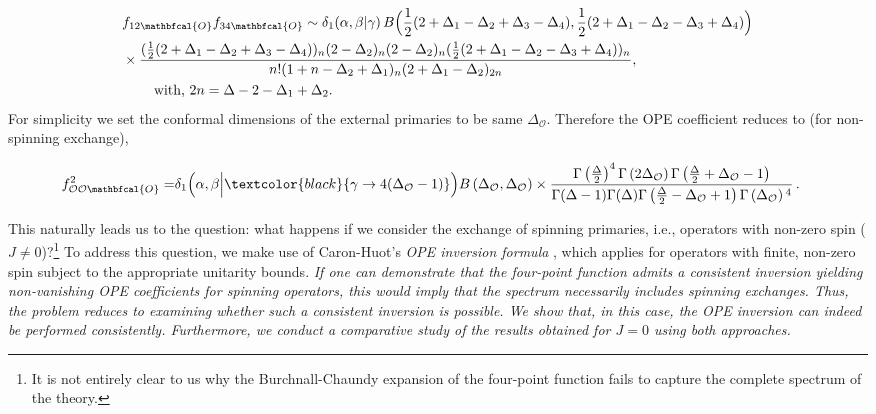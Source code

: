 \begin{align}
    \begin{split}
&f_{12\mathbfcal{O}}f_{34\mathbfcal{O}}\sim \delta_1(\alpha,\beta|\gamma) \,B\Big(\frac{1}{2}(2+\Delta_1-\Delta_2+\Delta_3-\Delta_4),\frac{1}{2}(2+\Delta_1-\Delta_2-\Delta_3+\Delta_4)\Big) \\ &\hspace{0 cm}\times\frac{(\frac{1}{2}(2+\Delta_1-\Delta_2+\Delta_3-\Delta_4))_n(2-\Delta_2)_n(2-\Delta_2)_n(\frac{1}{2}(2+\Delta_1-\Delta_2-\Delta_3+\Delta_4))_n}{  n!(1+n-\Delta_2+\Delta_1 )_n (2+\Delta_1-\Delta_2 )_{2n}},\,\,\,\\&\hspace{0.8cm}\textrm{with,\,\,}2n=\Delta-2-\Delta_1+\Delta_2.
    \end{split}
\end{align}
For simplicity we set the conformal dimensions of  the external primaries to be same $\Delta_{\mathcal{O}}$. Therefore the OPE coefficient reduces to (for non-spinning exchange),

\begin{tcolorbox}[thesisresultbox, title=OPE coefficient for EFT correction (scalar exchange)]
\restorethesisbodyformat
\begin{align}
    \begin{split}
    \label{4.46o}
f^2_{\mathcal{O}\mathcal{O}\mathbfcal{O}}=& \delta_1\Big(\alpha,\beta\Big|\textcolor{black}{\gamma\to4(\Delta_{\mathcal{O}}-1)}\Big) B\left(\Delta_{\mathcal{O}},\Delta_{\mathcal{O}}\right)\times\frac{\Gamma \left(\frac{\Delta }{2}\right)^4 \Gamma \left(2 \Delta _\mathcal{O}\right) \Gamma \left(\frac{\Delta }{2}+\Delta _\mathcal{O}-1\right)}{\Gamma (\Delta -1) \Gamma (\Delta ) \Gamma \left(\frac{\Delta }{2}-\Delta _\mathcal{O}+1\right) \Gamma \left(\Delta _\mathcal{O}\right){}^4}\,.
    \end{split}
\end{align}
\end{tcolorbox}
\restorethesisbodyformat

\vspace{0.5 cm}
\noindent
This naturally leads us to the question: what happens if we consider the exchange of spinning primaries, i.e., operators with non-zero spin ($J \ne 0$)?\footnote{It is not entirely clear to us why the Burchnall-Chaundy expansion of the four-point function fails to capture the complete spectrum of the theory.} To address this question, we make use of Caron-Huot's \textit{OPE inversion formula} \cite{Caron-Huot:2017vep}, which applies for  operators with finite, non-zero spin subject to the appropriate unitarity bounds. \textit{If one can demonstrate that the four-point function admits a consistent inversion yielding non-vanishing OPE coefficients for spinning operators, this would imply that the spectrum necessarily includes spinning exchanges. Thus, the problem reduces to examining whether such a consistent inversion is possible. We show that, in this case, the OPE inversion can indeed be performed consistently. Furthermore, we conduct a comparative study of the results obtained for $J=0$ using both approaches. }
\par
